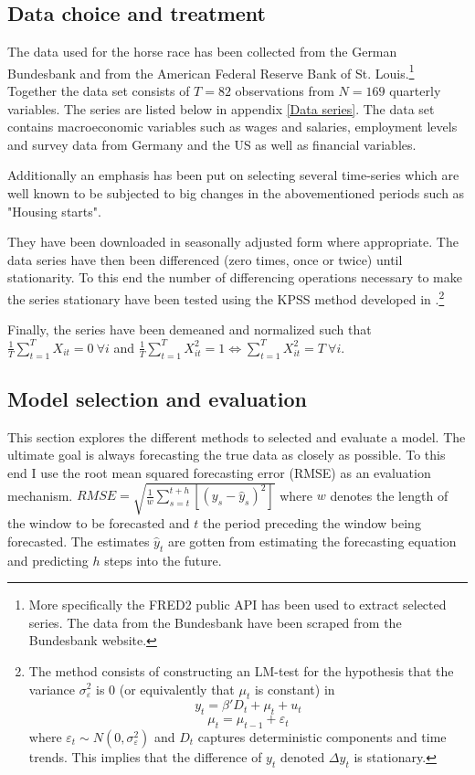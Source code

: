\documentclass[12pt]{article}
\begin{document}
\subsection{Data choice and treatment}
The data used for the horse race has been collected from the German Bundesbank and from the American Federal Reserve Bank of St. Louis.\footnote{More specifically the FRED2 public API has been used to extract selected series. The data from the Bundesbank have been scraped from the Bundesbank website.}  Together the data set consists of $T=82$ observations from $N=169$ quarterly variables. The series are listed below in appendix \ref{Data series}. The data set contains macroeconomic variables such as wages and salaries, employment levels and survey data from Germany and the US as well as financial variables.

Additionally an emphasis has been put on selecting several time-series which are well known to be subjected to big changes in the abovementioned periods such as "Housing starts".


They have been downloaded in seasonally adjusted form where appropriate. The data series have then been differenced (zero times, once or twice) until stationarity. To this end the number of differencing operations necessary to make the series stationary have been tested using the KPSS method developed in \citet{kwiatkowski1992testing}.\footnote{The method consists of constructing an LM-test for the hypothesis that the variance $\sigma^2_\varepsilon$ is 0 (or equivalently that $\mu_t$ is constant) in $$y_t = \beta'D_t + \mu_t + u_t$$ $$\mu_t = \mu_{t-1} + \varepsilon_t$$ where $\varepsilon_t \sim N(0, \sigma^2_\varepsilon)$ and $D_t$ captures deterministic components and time trends. This implies that the difference of $y_t$ denoted $\Delta y_t$ is stationary.}

Finally, the series have been demeaned and normalized such that $\frac{1}{T}\sum_{t=1}^T X_{it} = 0 \ \forall i$ and $\frac{1}{T}\sum_{t=1}^T X_{it}^2 = 1 \Leftrightarrow \sum_{t=1}^T X_{it}^2 = T \ \forall i$. \\


\subsection{Model selection and evaluation}
This section explores the different methods to selected and evaluate a model. The ultimate goal is always forecasting the true data as closely as possible. To this end I use the root mean squared forecasting error (RMSE) as an evaluation mechanism. $RMSE = \sqrt{\frac{1}{w}\sum_{s=t}^{t+h}[(y_s - \hat y_s)^2]}$ where $w$ denotes the length of the window to be forecasted and $t$ the period preceding the window being forecasted. The estimates $\hat y_t$ are gotten from estimating the forecasting equation and predicting $h$ steps into the future.
\end{document}
